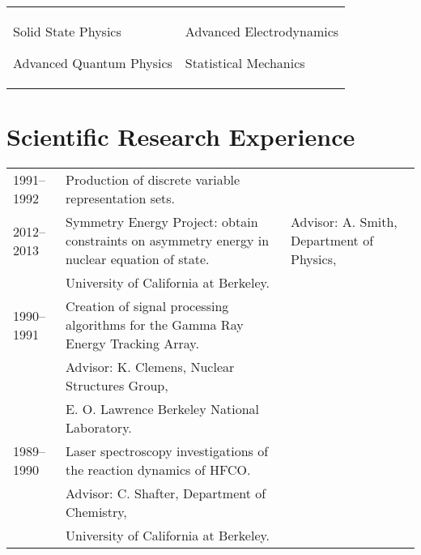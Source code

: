 \documentclass[margin,line,pifont,palatino,courier]{cv_short_current}
\newenvironment{list1}{
  \begin{list}{\ding{113}}{%
      \setlength{\itemsep}{0in}
      \setlength{\parsep}{0in} \setlength{\parskip}{0in}
      \setlength{\topsep}{0in} \setlength{\partopsep}{0in}
      \setlength{\leftmargin}{0.17in}}}{\end{list}}
\begin{document}
\begin{resume}
\begin{list1}
\begin{tabular}{@{}p{2.3in}p{3in}}
\begin{list1}
\item Solid State Physics
\item Advanced Quantum Physics
\end{list1}
&
\begin{list1}
\item Advanced Electrodynamics
\item Statistical Mechanics
\end{list1}

\end{tabular}

\section{\sc Scientific Research Experience}

\begin{tabular}{@{}p{0.8in}p{4in}}

1991--1992 & Production of discrete variable representation sets. \\
2012--2013 & Symmetry Energy Project: obtain constraints on asymmetry energy in nuclear equation of state.
& \hspace{0.2in} Advisor: A. Smith, Department of Physics,\\
& \hspace{0.2in} University of California at Berkeley.\\

1990--1991 & Creation of signal processing algorithms for the Gamma Ray Energy Tracking Array. \\
& \hspace{0.2in} Advisor: K. Clemens, Nuclear Structures Group, \\
& \hspace{0.2in} E. O. Lawrence Berkeley National Laboratory.\\

1989--1990 & Laser spectroscopy investigations of the reaction dynamics of HFCO.\\
& \hspace{0.2in} Advisor: C. Shafter, Department of Chemistry,\\
& \hspace{0.2in} University of California at Berkeley.\\

\end{tabular}


\end{list1}
\end{resume}
\end{document}
